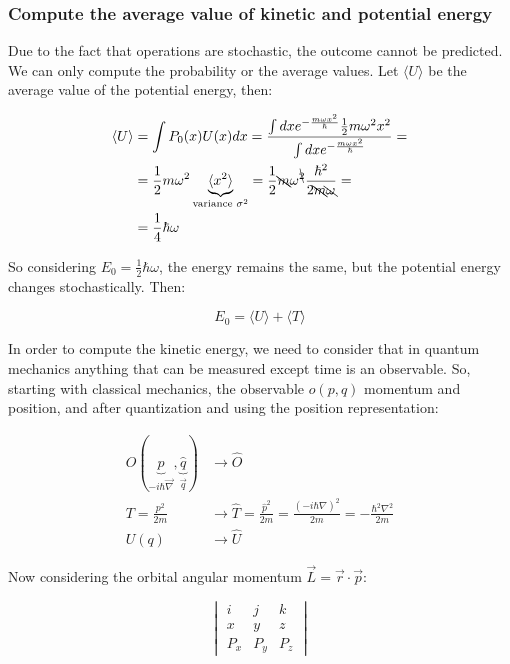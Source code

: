     \subsubsection{Compute the average value of kinetic and potential energy}
    Due to the fact that operations are stochastic, the outcome cannot be predicted. 
    We can only compute the probability or the average values.
    Let $\langle U\rangle $ be the average value of the potential energy, then:

    \begin{align*}
      \langle U\rangle  &= \int P_0(x)U(x)dx = \frac{\int dx e^{-\frac{m\omega x^2}{\hbar}}\frac{1}{2}m\omega^2x^2}{\int dx e^{-\frac{m\omega x^2}{\hbar}}} =\\
          &= \frac{1}{2}m\omega^2\underbrace{\langle x^2\rangle }_{\text{variance }\sigma^2} = \frac{1}{2}\bcancel{m}\omega^{\bcancel{2}}\frac{\hbar^2}{2\bcancel{m}\bcancel{\omega}}=\\
          &=\frac{1}{4}\hbar\omega
    \end{align*}

    So considering $E_0 = \frac{1}{2}\hbar\omega$, the energy remains the same, but the potential energy changes stochastically. 
    Then:

    $$E_0 = \langle U\rangle  + \langle T\rangle $$

    In order to compute the kinetic energy, we need to consider that in quantum mechanics anything that can be measured except time is an observable.
    So, starting with classical mechanics, the observable $o(p,q)$ momentum and position, and after quantization and using the position representation:

    \begin{align*}
      O(\underbrace{\hat{p}}_{-i\hbar\vec{\nabla}},\underbrace{\hat{q}}_{\vec{q}}) &\rightarrow \hat{O}\\
      T = \frac{p^2}{2m}&\rightarrow \hat{T} = \frac{\hat{p}^2}{2m} = \frac{(-i\hbar\nabla)^2}{2m} = -\frac{\hbar^2\nabla^2}{2m}\\
      U(q)&\rightarrow \hat{U}
    \end{align*}

    Now considering the orbital angular momentum $\vec{L} =\vec{r}\cdot\vec{p}$:

    $$\begin{vmatrix}i&j&k\\x&y&z\\P_x&P_y&P_z\end{vmatrix}$$

